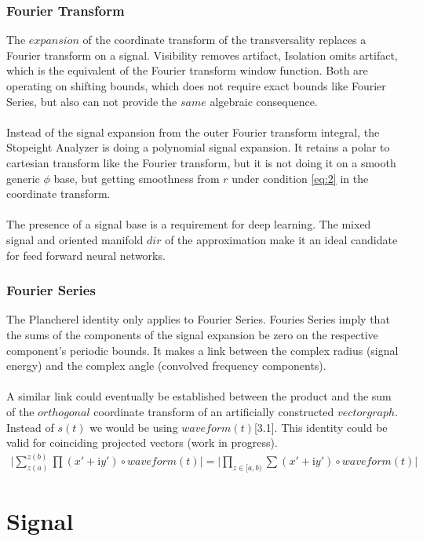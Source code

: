 \documentclass{report}
\begin{document}
\subsection*{Fourier Transform}
The $expansion$ of the coordinate transform of the transversality replaces a Fourier transform on a signal. Visibility removes artifact, Isolation omits artifact, which is the equivalent of the Fourier transform window function. Both are operating on shifting bounds, which does not require exact bounds like Fourier Series, but also can not provide the $same$ algebraic consequence.\\\\
Instead of the signal expansion from the outer Fourier transform integral, the Stopeight Analyzer is doing a polynomial signal expansion. It retains a polar to cartesian transform like the Fourier transform, but it is not doing it on a smooth generic $\phi$ base, but getting smoothness from $r$ under condition \eqref{eq:2} in the coordinate transform.\\\\
The presence of a signal base is a requirement for deep learning. The mixed signal and oriented manifold $dir$ of the approximation make it an ideal candidate for feed forward neural networks.

\subsection*{Fourier Series}
The Plancherel identity only applies to Fourier Series. Fouries Series imply that the sums of the components of the signal expansion be zero on the respective component's periodic bounds. It makes a link between the complex radius (signal energy) and the complex angle (convolved frequency components).\\\\
A similar link could eventually be established between the product and the sum of the $orthogonal$ coordinate transform of an artificially constructed $vectorgraph$. Instead of $s(t)$ we would be using $waveform(t)$\cite{Grapher}[3.1]. This identity could be valid for coinciding projected vectors (work in progress).
\begin{align}
\vert \sum \limits _{z(a)}^{z(b)} \prod (x'+\mathrm{i}y')\circ waveform(t) \vert=\vert \prod \limits _{z \in [a,b)} \sum (x'+\mathrm{i}y')\circ waveform(t) \vert
\end{align}

\chapter{Signal}
\end{document}
